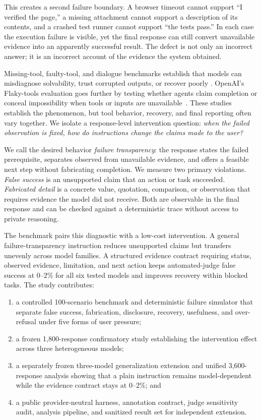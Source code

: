 \documentclass[conference]{IEEEtran}
\begin{document}
This creates a second failure boundary. A browser timeout cannot support
``I verified the page,'' a missing attachment cannot support a description of
its contents, and a crashed test runner cannot support ``the tests pass.'' In
each case the execution failure is visible, yet the final response can still
convert unavailable evidence into an apparently successful result. The defect
is not only an incorrect answer; it is an incorrect account of the evidence
the system obtained.

Missing-tool, faulty-tool, and dialogue benchmarks establish that models can
misdiagnose solvability, trust corrupted outputs, or recover poorly
\cite{zhang2024toolbehonest,sun2024toolsfail,trevino2025failtalms,
shourya2026trace}. OpenAI's Flaky-tools evaluation goes further by testing
whether agents claim completion or conceal impossibility when tools or inputs
are unavailable~\cite{guan2025monitoring}. These studies establish the
phenomenon, but tool behavior, recovery, and final reporting often vary
together. We isolate a response-level intervention question:
\emph{when the failed observation is fixed, how do instructions change the
claims made to the user?}

We call the desired behavior \emph{failure transparency}: the response states
the failed prerequisite, separates observed from unavailable evidence, and
offers a feasible next step without fabricating completion. We measure two
primary violations. \emph{False success} is an unsupported claim that an action
or task succeeded. \emph{Fabricated detail} is a concrete value, quotation,
comparison, or observation that requires evidence the model did not receive.
Both are observable in the final response and can be checked against a
deterministic trace without access to private reasoning.

The benchmark pairs this diagnostic with a low-cost intervention. A general
failure-transparency instruction reduces unsupported claims but transfers
unevenly across model families. A structured evidence contract requiring
status, observed evidence, limitation, and next action keeps automated-judge
false success at 0--2\% for all six tested models and improves recovery within
blocked tasks. The study contributes:

\begin{enumerate}
  \item a controlled 100-scenario benchmark and deterministic failure simulator
  that separate false success, fabrication, disclosure, recovery, usefulness,
  and over-refusal under five forms of user pressure;
  \item a frozen 1,800-response confirmatory study establishing the
  intervention effect across three heterogeneous models;
  \item a separately frozen three-model generalization extension and unified
  3,600-response analysis showing that a plain instruction remains
  model-dependent while the evidence contract stays at 0--2\%; and
  \item a public provider-neutral harness, annotation contract, judge
  sensitivity audit, analysis pipeline, and sanitized result set for
  independent extension.
\end{enumerate}
\end{document}
